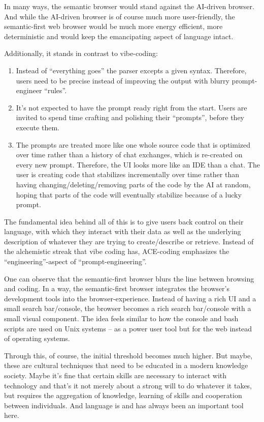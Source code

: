 \documentclass[12pt,a4paper]{article}
\begin{document}
In many ways, the semantic browser would stand against the AI-driven browser. And while the AI-driven browser is of course much more user-friendly, the semantic-first web browser would be much more energy efficient, more deterministic and would keep the emancipating aspect of language intact.

Additionally, it stands in contrast to vibe-coding:

\begin{enumerate}
    \item Instead of ``everything goes'' the parser excepts a given syntax. Therefore, users need to be precise instead of improving the output with blurry prompt-engineer ``rules''.
    \item It's not expected to have the prompt ready right from the start. Users are invited to spend time crafting and polishing their ``prompts'', before they execute them.
    \item The prompts are treated more like one whole source code that is optimized over time rather than a history of chat exchanges, which is re-created on every new prompt. Therefore, the UI looks more like an IDE than a chat. The user is creating code that stabilizes incrementally over time rather than having changing/deleting/removing parts of the code by the AI at random, hoping that parts of the code will eventually stabilize because of a lucky prompt.
\end{enumerate}

The fundamental idea behind all of this is to give users back control on their language, with which they interact with their data as well as the underlying description of whatever they are trying to create/describe or retrieve. Instead of the alchemistic streak that vibe coding has, ACE-coding emphasizes the ``engineering''-aspect of ``prompt-engineering''.

One can observe that the semantic-first browser blurs the line between browsing and coding. In a way, the semantic-first browser integrates the browser's development tools into the browser-experience. Instead of having a rich UI and a small search bar/console, the browser becomes a rich search bar/console with a small visual component. The idea feels similar to how the console and bash scripts are used on Unix systems -- as a power user tool but for the web instead of operating systems.

Through this, of course, the initial threshold becomes much higher. But maybe, these are cultural techniques that need to be educated in a modern knowledge society. Maybe it's fine that certain skills are necessary to interact with technology and that's it not merely about a strong will to do whatever it takes, but requires the aggregation of knowledge, learning of skills and cooperation between individuals. And language is and has always been an important tool here.
\end{document}
